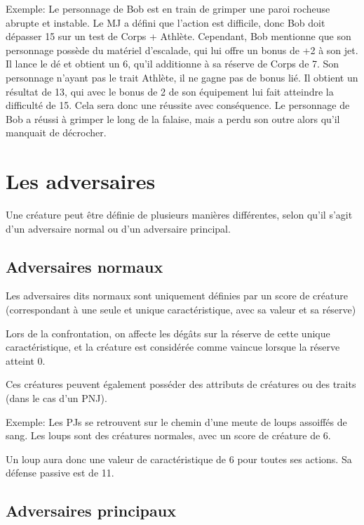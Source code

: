 \documentclass[a4paper,10pt,twoside,twocolumn,openany,bg=print,justified]{dndbook}
\begin{document}
\begin{quotebox}
Exemple: Le personnage de Bob est en train de grimper une paroi rocheuse abrupte et instable. Le MJ a défini que l'action est difficile, donc Bob doit dépasser 15 sur un test de Corps + Athlète. Cependant, Bob mentionne que son personnage possède du matériel d'escalade, qui lui offre un bonus de +2 à son jet. Il lance le dé et obtient un 6, qu'il additionne à sa réserve de Corps de 7. Son personnage n'ayant pas le trait Athlète, il ne gagne pas de bonus lié. Il obtient un résultat de 13, qui avec le bonus de 2 de son équipement lui fait atteindre la difficulté de 15. Cela sera donc une réussite avec conséquence. Le personnage de Bob a réussi à grimper le long de la falaise, mais a perdu son outre alors qu'il manquait de décrocher.
\end{quotebox}

\section{Les adversaires}

Une créature peut être définie de plusieurs manières différentes, selon qu'il s'agit d'un adversaire normal ou d'un adversaire principal.

\subsection{Adversaires normaux}

Les adversaires dits normaux sont uniquement définies par un score de créature (correspondant à une seule et unique caractéristique, avec sa valeur et sa réserve)

Lors de la confrontation, on affecte les dégâts sur la réserve de cette unique caractéristique, et la créature est considérée comme vaincue lorsque la réserve atteint 0.

Ces créatures peuvent également posséder des attributs de créatures ou des traits (dans le cas d'un PNJ).

\begin{quotebox}
Exemple: Les PJs se retrouvent sur le chemin d'une meute de loups assoiffés de sang. Les loups sont des créatures normales, avec un score de créature de 6.

Un loup aura donc une valeur de caractéristique de 6 pour toutes ses actions. Sa défense passive est de 11.
\end{quotebox}

\subsection{Adversaires principaux}
\end{document}
